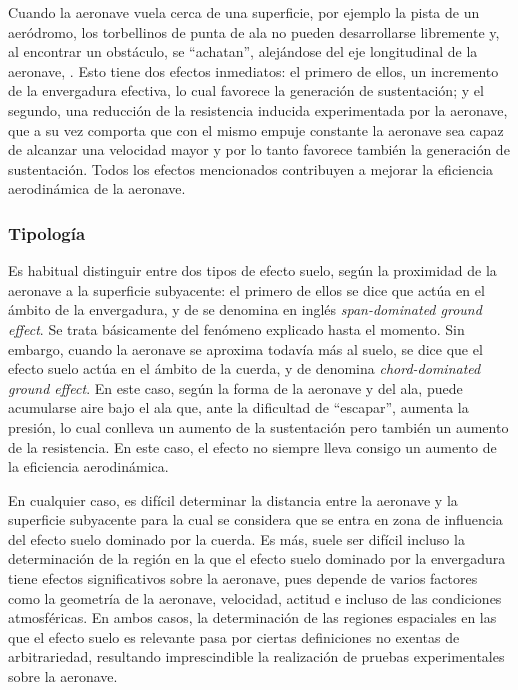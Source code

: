 Cuando la aeronave vuela cerca de una superficie, por ejemplo la pista de un aeródromo, los torbellinos de punta de ala no pueden desarrollarse libremente y, al encontrar un obstáculo, se “achatan”, alejándose del eje longitudinal de la aeronave, . Esto tiene dos efectos inmediatos: el primero de ellos, un incremento de la envergadura efectiva, lo cual favorece la generación de sustentación; y el segundo, una reducción de la resistencia inducida experimentada por la aeronave, que a su vez comporta que con el mismo empuje constante la aeronave sea capaz de alcanzar una velocidad mayor y por lo tanto favorece también la generación de sustentación. Todos los efectos mencionados contribuyen a mejorar la eficiencia aerodinámica de la aeronave.


\subsubsection{Tipología}
\label{sec:wig:ge:tipology}

Es habitual distinguir entre dos tipos de efecto suelo, según la proximidad de la aeronave a la superficie subyacente: el primero de ellos se dice que actúa en el ámbito de la envergadura, y de se denomina en inglés \emph{span-dominated ground effect}. Se trata básicamente del fenómeno explicado hasta el momento. Sin embargo, cuando la aeronave se aproxima todavía más al suelo, se dice que el efecto suelo actúa en el ámbito de la cuerda, y de denomina \emph{chord-dominated ground effect}. En este caso, según la forma de la aeronave y del ala, puede acumularse aire bajo el ala que, ante la dificultad de “escapar”, aumenta la presión, lo cual conlleva un aumento de la sustentación pero también un aumento de la resistencia. En este caso, el efecto no siempre lleva consigo un aumento de la eficiencia aerodinámica.

En cualquier caso, es difícil determinar la distancia entre la aeronave y la superficie subyacente para la cual se considera que se entra en zona de influencia del efecto suelo dominado por la cuerda. Es más, suele ser difícil incluso la determinación de la región en la que el efecto suelo dominado por la envergadura tiene efectos significativos sobre la aeronave, pues depende de varios factores como la geometría de la aeronave, velocidad, actitud e incluso de las condiciones atmosféricas. En ambos casos, la determinación de las regiones espaciales en las que el efecto suelo es relevante pasa por ciertas definiciones no exentas de arbitrariedad, resultando imprescindible la realización de pruebas experimentales sobre la aeronave.


